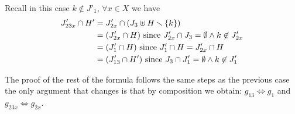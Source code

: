\documentclass[runningheads]{llncs}
\begin{document}
Recall in this case $k \notin J'_1$, $\forall x \in X$ we have
\begin{align*}		
J'_{23x} \cap H' & = J'_{2x}  \cap {\left(J_3 \uplus H \smallsetminus{\left\{k\right\}}\right)} \\
& = {\left(J'_{2x}\cap H \right)} \text{ since } J'_{2x}\cap J_3=\emptyset \land k\not\in J'_{2x} \\
& = {\left(J'_1\cap H \right)} \text{ since } J'_1 \cap H = J'_{2x} \cap H\\
& = {\left(J'_{13}\cap H' \right)} \text{ since } J_3\cap J'_1=\emptyset \land k\not\in J_1'
\end{align*}

The proof of the rest of the formula follows the same steps as the previous case the only argument that changes is that by composition we obtain:  $g_{13} \Leftrightarrow g_1$ and
$g_{23x}  \Leftrightarrow g_{2x}$.
\end{document}
